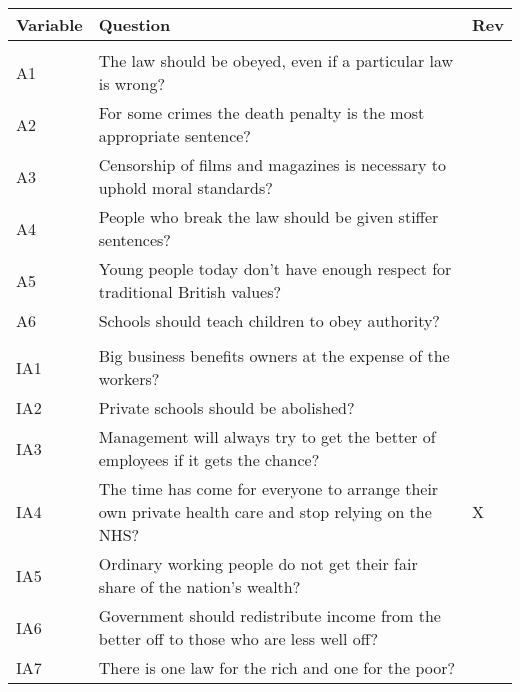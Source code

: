 
\begin{tabular}{lll}
\toprule
Variable & Question & Rev\\
\midrule
\addlinespace[0.3em]
\multicolumn{3}{l}{\textbf{Authority (A)}}\\
\hline
\hspace{1em}A1 & The law should be obeyed, even if a particular law is wrong? & \\
\hspace{1em}A2 & For some crimes the death penalty is the most appropriate sentence? & \\
\hspace{1em}A3 & Censorship of films and magazines is necessary to uphold moral standards? & \\
\hspace{1em}A4 & People who break the law should be given stiffer sentences? & \\
\hspace{1em}A5 & Young people today don't have enough respect for traditional British values? & \\
\hspace{1em}A6 & Schools should teach children to obey authority? & \\
\addlinespace[0.3em]
\multicolumn{3}{l}{\textbf{Inequality Aversion (IA)}}\\
\hline
\hspace{1em}IA1 & Big business benefits owners at the expense of the workers? & \\
\hspace{1em}IA2 & Private schools should be abolished? & \\
\hspace{1em}IA3 & Management will always try to get the better of employees if it gets the chance? & \\
\hspace{1em}IA4 & The time has come for everyone to arrange their own private health care and stop relying on the NHS? & X\\
\hspace{1em}IA5 & Ordinary working people do not get their fair share of the nation's wealth? & \\
\hspace{1em}IA6 & Government should redistribute income from the better off to those who are less well off? & \\
\hspace{1em}IA7 & There is one law for the rich and one for the poor? & \\

\end{tabular}
